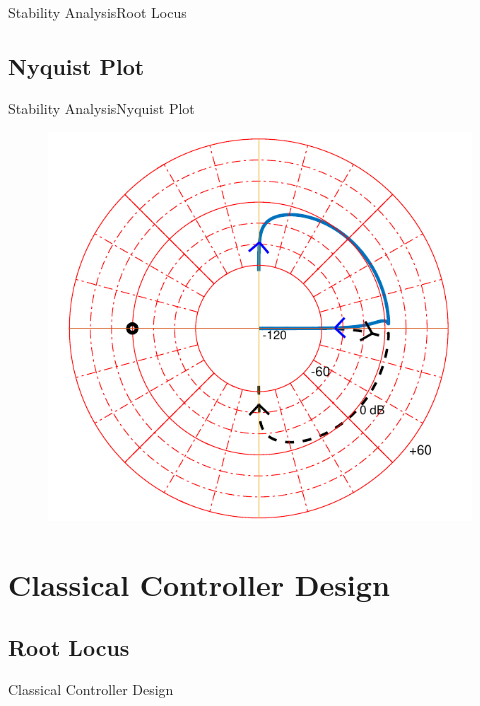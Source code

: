 \begin{frame}{Stability Analysis}{Root Locus}
\begin{minipage}{\linewidth}
\begin{minipage}{0.45\linewidth}
\begin{figure}[H]
			\centering
		\end{figure}
	\end{minipage}
\end{minipage}
\end{frame}

\subsection{Nyquist Plot}
\begin{frame}{Stability Analysis}{Nyquist Plot}
\begin{figure}
		\includegraphics[scale=.56]{Pictures/nyquistCubli}
		\centering
\end{figure}
	
\end{frame}

\section{Classical Controller Design}

\subsection{Root Locus}
\begin{frame}{Classical Controller Design}{}	
\begin{figure}
	
\end{figure}
\end{frame}

